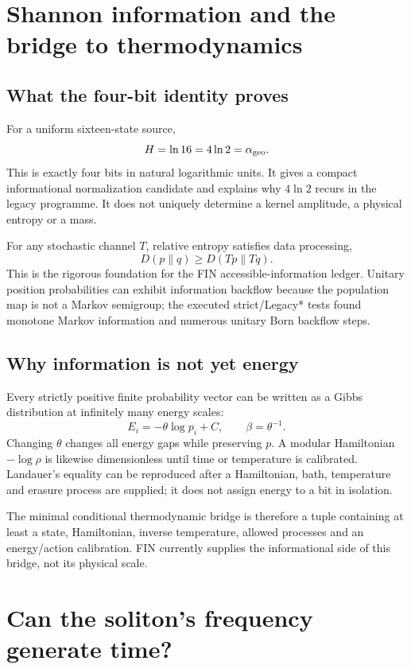 \documentclass[11pt,a4paper]{article}
\theoremstyle{definition}
\theoremstyle{remark}
\begin{document}
\section{Shannon information and the bridge to thermodynamics}

\subsection{What the four-bit identity proves}

For a uniform sixteen-state source,
\[
H=\ln16=4\ln2=\alpha_{\rm geo}.
\]
This is exactly four bits in natural logarithmic units. It gives a compact informational normalization candidate and explains why $4\ln2$ recurs in the legacy programme. It does not uniquely determine a kernel amplitude, a physical entropy or a mass.

For any stochastic channel $T$, relative entropy satisfies data processing,
\[
D(p\|q)\ge D(Tp\|Tq).
\]
This is the rigorous foundation for the FIN accessible-information ledger. Unitary position probabilities can exhibit information backflow because the population map is not a Markov semigroup; the executed strict/Legacy* tests found monotone Markov information and numerous unitary Born backflow steps.

\subsection{Why information is not yet energy}

Every strictly positive finite probability vector can be written as a Gibbs distribution at infinitely many energy scales:
\[
E_i=-\theta\log p_i+C,\qquad \beta=\theta^{-1}.
\]
Changing $\theta$ changes all energy gaps while preserving $p$. A modular Hamiltonian $-\log\rho$ is likewise dimensionless until time or temperature is calibrated. Landauer's equality can be reproduced after a Hamiltonian, bath, temperature and erasure process are supplied; it does not assign energy to a bit in isolation.

The minimal conditional thermodynamic bridge is therefore a tuple containing at least a state, Hamiltonian, inverse temperature, allowed processes and an energy/action calibration. FIN currently supplies the informational side of this bridge, not its physical scale.

\section{Can the soliton's frequency generate time?}
\end{document}
